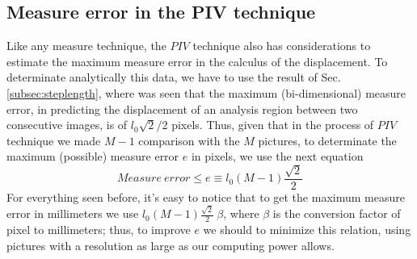 \subsection{Measure error in the PIV technique}
Like any measure technique, the $PIV$ technique also has considerations to 
estimate the maximum measure error in the calculus of the displacement.
To determinate analytically this data, we have to use the result of
Sec. \ref{subsec:steplength}, where was seen that the 
maximum (bi-dimensional) measure error, 
in predicting the displacement of an analysis region between two consecutive images,
is of $l_0\sqrt{2}/2$ pixels. Thus, given that in the process of $PIV$ technique 
we made $M-1$ comparison with the $M$ pictures, 
to determinate the maximum (possible) measure error $e$ in pixels, we use the next equation
\begin{equation}\label{eq:measureerror}
Measure~error\leq e\equiv l_0(M-1)\frac{\sqrt{2}}{2}
\end{equation}
For everything seen before, it's easy to notice that to get the maximum  measure error
in millimeters we use $l_0(M-1)\frac{\sqrt{2}}{2}~\beta$, where $\beta$ is the 
conversion factor of pixel to millimeters; thus, to improve $e$ we should
to minimize this relation, using pictures with a resolution 
as large as our computing power allows.